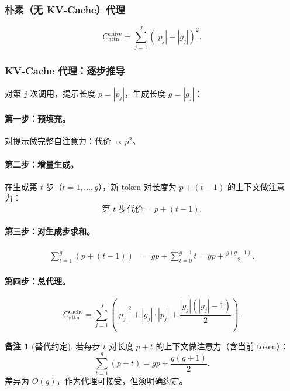 \documentclass[11pt,a4paper]{article}
\theoremstyle{definition}
\newtheorem{remark}{备注}[section]
\begin{document}
\subsubsection{朴素（无 KV-Cache）代理}
\begin{equation}\label{eq:naive}
C_{\mathrm{attn}}^{\mathrm{naive}} = \sum_{j=1}^{J} (|p_j| + |g_j|)^2.
\end{equation}

\subsubsection{KV-Cache 代理：逐步推导}

对第 $j$ 次调用，提示长度 $p = |p_j|$，生成长度 $g = |g_j|$：

\paragraph{第一步：预填充。} 对提示做完整自注意力：代价 $\propto p^2$。

\paragraph{第二步：增量生成。} 在生成第 $t$ 步（$t=1,\ldots,g$），新 token 对长度为 $p+(t-1)$ 的上下文做注意力：
\begin{equation}
\text{第 } t \text{ 步代价} = p + (t-1).
\end{equation}

\paragraph{第三步：对生成步求和。}
\begin{align}
\sum_{t=1}^{g}(p + (t-1))
&= gp + \sum_{t=0}^{g-1} t = gp + \frac{g(g-1)}{2}. \label{eq:gensum}
\end{align}

\paragraph{第四步：总代理。}
\begin{equation}\label{eq:cache}
\boxed{
C_{\mathrm{attn}}^{\mathrm{cache}} = \sum_{j=1}^{J}\left(
    |p_j|^2 + |g_j|\cdot|p_j| + \frac{|g_j|(|g_j|-1)}{2}
\right).
}
\end{equation}

\begin{remark}[替代约定]
若每步 $t$ 对长度 $p+t$ 的上下文做注意力（含当前 token）：
\[
\sum_{t=1}^{g}(p+t) = gp + \frac{g(g+1)}{2}.
\]
差异为 $O(g)$，作为代理可接受，但须明确约定。
\end{remark}
\end{document}
